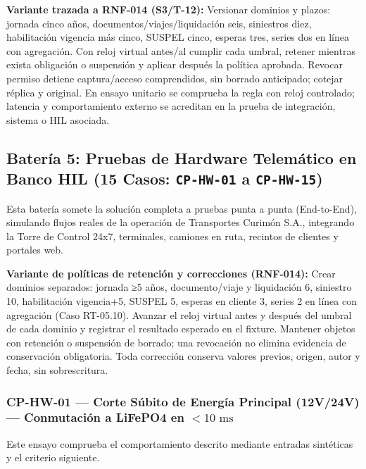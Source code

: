 \par\noindent\textbf{Variante trazada a RNF-014 (S3/T-12):} Versionar dominios y plazos: jornada cinco años, documentos/viajes/liquidación seis, siniestros diez, habilitación vigencia más cinco, SUSPEL cinco, esperas tres, series dos en línea con agregación. Con reloj virtual antes/al cumplir cada umbral, retener mientras exista obligación o suspensión y aplicar después la política aprobada. Revocar permiso detiene captura/acceso comprendidos, sin borrado anticipado; cotejar réplica y original. En ensayo unitario se comprueba la regla con reloj controlado; latencia y comportamiento externo se acreditan en la prueba de integración, sistema o HIL asociada.\par
\subsection*{Batería 5: Pruebas de Hardware Telemático en Banco HIL (15 Casos: \texttt{C\allowbreak{}P\allowbreak{}-\allowbreak{}H\allowbreak{}W\allowbreak{}-\allowbreak{}0\allowbreak{}1\allowbreak{}} a \texttt{C\allowbreak{}P\allowbreak{}-\allowbreak{}H\allowbreak{}W\allowbreak{}-\allowbreak{}1\allowbreak{}5\allowbreak{}})}

Esta batería somete la solución completa a pruebas punta a punta (End-to-End), simulando flujos reales de la operación de Transportes Curimón S.A., integrando la Torre de Control 24x7, terminales, camiones en ruta, recintos de clientes y portales web.




\par\noindent\textbf{Variante de políticas de retención y correcciones (RNF-014):} Crear dominios separados: jornada ≥5 años, documento/viaje y liquidación 6, siniestro 10, habilitación vigencia+5, SUSPEL 5, esperas en cliente 3, series 2 en línea con agregación (Caso RT-05.10). Avanzar el reloj virtual antes y después del umbral de cada dominio y registrar el resultado esperado en el fixture. Mantener objetos con retención o suspensión de borrado; una revocación no elimina evidencia de conservación obligatoria. Toda corrección conserva valores previos, origen, autor y fecha, sin sobrescritura.\par\par




\subsubsection*{CP-HW-01 — Corte Súbito de Energía Principal (12V/24V) — Conmutación a LiFePO4 en \(< 10\text{ ms}\)}\label{sec:9-cp-hw-01}
Este ensayo comprueba el comportamiento descrito mediante entradas sintéticas y el criterio siguiente.

